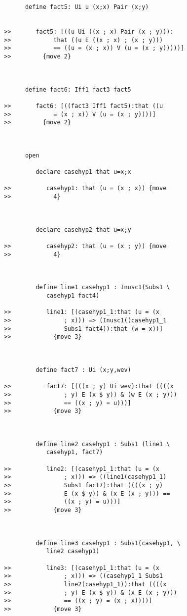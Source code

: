 \documentclass[12pt]{article}
\begin{document}
\begin{verbatim}
      define fact5: Ui u (x;x) Pair (x;y)


>>       fact5: [((u Ui ((x ; x) Pair (x ; y))):
>>            that ((u E ((x ; x) ; (x ; y)))
>>            == ((u = (x ; x)) V (u = (x ; y)))))]
>>         {move 2}



      define fact6: Iff1 fact3 fact5

>>       fact6: [((fact3 Iff1 fact5):that ((u
>>            = (x ; x)) V (u = (x ; y))))]
>>         {move 2}



      open

         declare casehyp1 that u=x;x

>>          casehyp1: that (u = (x ; x)) {move
>>            4}



         declare casehyp2 that u=x;y

>>          casehyp2: that (u = (x ; y)) {move
>>            4}



         define line1 casehyp1 : Inusc1(Subs1 \
            casehyp1 fact4)

>>          line1: [(casehyp1_1:that (u = (x
>>               ; x))) => (Inusc1((casehyp1_1
>>               Subs1 fact4)):that (w = x))]
>>            {move 3}



         define fact7 : Ui (x;y,wev)

>>          fact7: [(((x ; y) Ui wev):that ((((x
>>               ; y) E (x $ y)) & (w E (x ; y)))
>>               == ((x ; y) = u)))]
>>            {move 3}



         define line2 casehyp1 : Subs1 (line1 \
            casehyp1, fact7)

>>          line2: [(casehyp1_1:that (u = (x
>>               ; x))) => ((line1(casehyp1_1)
>>               Subs1 fact7):that ((((x ; y)
>>               E (x $ y)) & (x E (x ; y))) ==
>>               ((x ; y) = u)))]
>>            {move 3}



         define line3 casehyp1 : Subs1(casehyp1, \
            line2 casehyp1)

>>          line3: [(casehyp1_1:that (u = (x
>>               ; x))) => ((casehyp1_1 Subs1
>>               line2(casehyp1_1)):that ((((x
>>               ; y) E (x $ y)) & (x E (x ; y)))
>>               == ((x ; y) = (x ; x))))]
>>            {move 3}




\end{verbatim}
\end{document}
